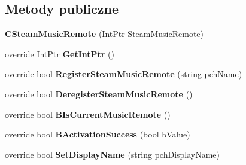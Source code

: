 \subsection*{Metody publiczne}
\begin{DoxyCompactItemize}
\item 
\mbox{\label{class_valve_1_1_steamworks_1_1_c_steam_music_remote_a607b951b9e380bf98ea6c96a877453fd}} 
{\bfseries C\+Steam\+Music\+Remote} (Int\+Ptr Steam\+Music\+Remote)
\item 
\mbox{\label{class_valve_1_1_steamworks_1_1_c_steam_music_remote_aedc90e4e36845e9566f5efca31c1b6a0}} 
override Int\+Ptr {\bfseries Get\+Int\+Ptr} ()
\item 
\mbox{\label{class_valve_1_1_steamworks_1_1_c_steam_music_remote_a6cd1f99e14bbd85ece7132788ae81dc5}} 
override bool {\bfseries Register\+Steam\+Music\+Remote} (string pch\+Name)
\item 
\mbox{\label{class_valve_1_1_steamworks_1_1_c_steam_music_remote_a8bcd3dc4e33f1b7f8d24f2ac04bff3b7}} 
override bool {\bfseries Deregister\+Steam\+Music\+Remote} ()
\item 
\mbox{\label{class_valve_1_1_steamworks_1_1_c_steam_music_remote_a2a5bf5514aa296609314fcd99088b727}} 
override bool {\bfseries B\+Is\+Current\+Music\+Remote} ()
\item 
\mbox{\label{class_valve_1_1_steamworks_1_1_c_steam_music_remote_a3038e038e71badefadb7db11d40a57d5}} 
override bool {\bfseries B\+Activation\+Success} (bool b\+Value)
\item 
\mbox{\label{class_valve_1_1_steamworks_1_1_c_steam_music_remote_a5b3be3ac3efffd80b03e90cfd4011d6a}} 
override bool {\bfseries Set\+Display\+Name} (string pch\+Display\+Name)
\item 
\mbox{\label{class_valve_1_1_steamworks_1_1_c_steam_music_remote_abf4dcf92f74b2cc3409a177c15805bc6}} 

\end{DoxyCompactItemize}
